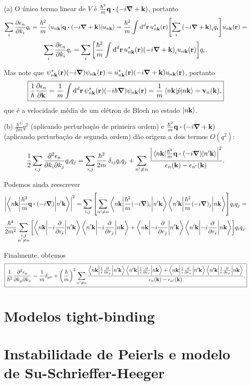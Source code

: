 \documentclass[a4paper,10pt]{article}
\begin{document}
\n

(a) O único termo linear de $V$ é $\frac{\hbar^2}{m} \q \vdot (-i\grad + \k)$, portanto
$$
\sum_{i} \pdv{\eps_n}{k_i} q_i = \frac{\hbar^2}{m} \ev{ \q \vdot (-i\grad + \k)}{u_{n\k}} =
\frac{\hbar^2}{m} \int \dd[d]{\r} u_{n\k}^*(\r) \qty[\sum_{i}\qty(-i\grad + \k)_i q_i] u_{n\k}(\r) =
$$
$$
\sum_{i} \pdv{\epsilon_n}{k_i} q_i =\sum_{i} \qty[\frac{\hbar^2}{m} \int \dd[d]{\vb{r}} u_{n\vb{k}}^*(\vb{r}) \qty(-i\grad + \vb{k})_i u_{n\vb{k}}(\vb{r}) ] q_i.
$$

Mas note que $\psi_{n\vb{k}}^*(\vb{r}) \qty(-i\grad) \psi_{n\vb{k}}(\vb{r}) = u_{n\vb{k}}^*(\vb{r}) \qty(-i\grad + \vb{k}) u_{n\vb{k}}(\vb{r})$, portanto
$$
\boxed{\frac{1}{\hbar} \pdv{\eps_n}{\k} = \frac{1}{m} \int \dd[d]{\r} \psi_{n\k}^*(\r) \qty(-i \hbar \grad) \psi_{n\k}(\r) =
\frac{1}{m} \ev{\hat{p}}{n\k} = \v_n(\k),}
$$
que é a velocidade média de um elétron de Bloch no estado $\ket{n\vb{k}}$.

\n

(b) $\frac{\hbar^2}{2m} q^2$ (aplicando perturbação de primeira ordem) e $\frac{\hbar^2}{m} \q \vdot (-i\grad + \k)$ (aplicando perturbação de segunda ordem) dão origem a dois termos $O(q^2)$:
$$
\frac{1}{2} \sum_{i,j} \pdv{\eps_n}{k_i}{k_j} q_i q_j =
\sum_{i,j} \frac{\hbar^2}{2m} \, \delta_{ij} q_i q_j +
\sum_{n' \neq n} \frac{\abs{\mel{n\k}{\frac{\hbar^2}{m} \q \vdot (-i\grad)}{n'\k}}^2}{\eps_n(\k) - \eps_{n'}(\k)}.
$$

Podemos ainda reescrever
$$
\abs{\mel**{n\k}{\frac{\hbar^2}{m} \q \vdot (-i\grad)}{n'\k}}^2 =
\sum_{i,j} \qty[ \sum_{n'\neq n}
\mel**{n\k}{\frac{\hbar^2}{m} (-i\grad)_i}{n'\k} \mel**{n'\k}{\frac{\hbar^2}{m} (-i\grad)_j}{n\k} ] q_i q_j =
$$
$$
\frac{\hbar^4}{2 m^2} \sum_{\substack{i,j \\ n' \neq n}}
\qty[
\mel**{n\vb{k}}{-i\pdv{r_i}}{n'\vb{k}} \mel**{n'\vb{k}}{-i\pdv{r_j}}{n\vb{k}} +
\mel**{n\vb{k}}{-i\pdv{r_j}}{n'\vb{k}} \mel**{n'\vb{k}}{-i\pdv{r_i}}{n\vb{k}}
] q_i q_j.
$$

Finalmente, obtemos
$$
\boxed{\frac{1}{\hbar^2} \pdv{\epsilon_n}{k_\mu}{k_\nu} = \frac{1}{m} \delta_{\mu\nu} + \qty(\frac{\hbar}{m})^2 \sum_{n'\neq n}
\frac{
\mel**{n\vb{k}}{\frac{1}{i}\pdv{r_\mu}}{n'\vb{k}} \mel**{n'\vb{k}}{\frac{1}{i}\pdv{r_\nu}}{n\vb{k}} +
\mel**{n\vb{k}}{\frac{1}{i}\pdv{r_\nu}}{n'\vb{k}} \mel**{n'\vb{k}}{\frac{1}{i}\pdv{r_\mu}}{n\vb{k}}
}{\epsilon_n(\vb{k}) - \epsilon_{n'}(\vb{k})}.}
$$


\pagebreak

\section{Modelos tight-binding}

\pagebreak

\section{Instabilidade de Peierls e modelo de Su-Schrieffer-Heeger}
\end{document}
